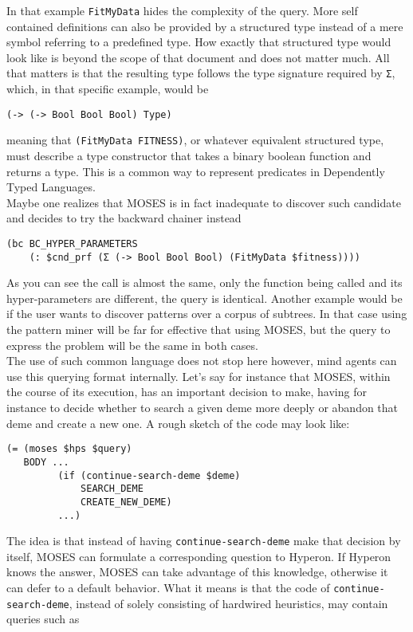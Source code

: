 \documentclass[]{report}
\begin{document}
In that example \texttt{FitMyData} hides the complexity of
the query.  More self contained definitions can also be provided by a
structured type instead of a mere symbol referring to a predefined
type.  How exactly that structured type would look like is beyond the
scope of that document and does not matter much.  All that matters is
that the resulting type follows the type signature required by
\texttt{Σ}, which, in that specific example, would be

\begin{verbatim}
(-> (-> Bool Bool Bool) Type)
\end{verbatim}
meaning that \texttt{(FitMyData FITNESS)}, or whatever
equivalent structured type, must describe a type constructor that
takes a binary boolean function and returns a type.  This is a common
way to represent predicates in Dependently Typed Languages.\\

Maybe one realizes that MOSES is in fact inadequate to discover such
candidate and decides to try the backward chainer instead

\begin{verbatim}
(bc BC_HYPER_PARAMETERS
    (: $cnd_prf (Σ (-> Bool Bool Bool) (FitMyData $fitness))))
\end{verbatim}
As you can see the call is almost the same, only the function being
called and its hyper-parameters are different, the query is identical.
Another example would be if the user wants to discover patterns over a
corpus of subtrees.  In that case using the pattern miner will be far
for effective that using MOSES, but the query to express the problem
will be the same in both cases.\\

The use of such common language does not stop here however, mind
agents can use this querying format internally.  Let's say for
instance that MOSES, within the course of its execution, has an
important decision to make, having for instance to decide whether to
search a given deme more deeply or abandon that deme and create a new
one.  A rough sketch of the code may look like:

\begin{verbatim}
(= (moses $hps $query)
   BODY ...
         (if (continue-search-deme $deme)
             SEARCH_DEME
             CREATE_NEW_DEME)
         ...)
\end{verbatim}
The idea is that instead of having
\texttt{continue-search-deme} make that decision by
itself, MOSES can formulate a corresponding question to Hyperon.  If
Hyperon knows the answer, MOSES can take advantage of this knowledge,
otherwise it can defer to a default behavior.  What it means is that
the code of \texttt{continue-search-deme}, instead of
solely consisting of hardwired heuristics, may contain queries such as
\end{document}
